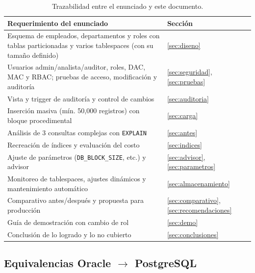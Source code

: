 \documentclass[12pt,a4paper]{article}
\begin{document}
\begin{table}[H]
\centering
\small
\renewcommand{\arraystretch}{1.3}
\begin{tabular}{p{}p{}}
\toprule
\textbf{Requerimiento del enunciado} & \textbf{Sección} \\
\midrule
Esquema de empleados, departamentos y roles con tablas particionadas y varios tablespaces (con su tamaño definido) & \ref{sec:diseno} \\
Usuarios admin/analista/auditor, roles, DAC, MAC y RBAC; pruebas de acceso, modificación y auditoría & \ref{sec:seguridad}, \ref{sec:pruebas} \\
Vista y trigger de auditoría y control de cambios & \ref{sec:auditoria} \\
Inserción masiva (mín. 50,000 registros) con bloque procedimental & \ref{sec:carga} \\
Análisis de 3 consultas complejas con \texttt{EXPLAIN} & \ref{sec:antes} \\
Recreación de índices y evaluación del costo & \ref{sec:indices} \\
Ajuste de parámetros (\texttt{DB\_\allowbreak{}BLOCK\_\allowbreak{}SIZE}, etc.) y advisor & \ref{sec:advisor}, \ref{sec:parametros} \\
Monitoreo de tablespaces, ajustes dinámicos y mantenimiento automático & \ref{sec:almacenamiento} \\
Comparativo antes/después y propuesta para producción & \ref{sec:comparativo}, \ref{sec:recomendaciones} \\
Guía de demostración con cambio de rol & \ref{sec:demo} \\
Conclusión de lo logrado y lo no cubierto & \ref{sec:conclusiones} \\
\bottomrule
\end{tabular}
\caption{Trazabilidad entre el enunciado y este documento.}
\end{table}

\subsection{Equivalencias Oracle $\rightarrow$ PostgreSQL}
\label{sec:equivalencias}
\end{document}

